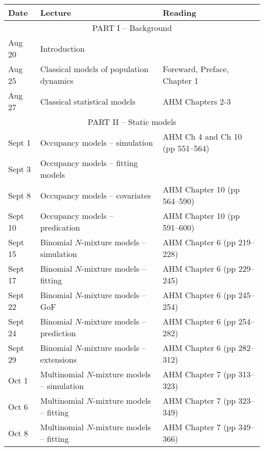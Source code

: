 \documentclass[12pt]{article}
\begin{document}
\begin{center}
\begin{tabular}[c]{lll}
\hline \hline
{\bf Date} & {\bf Lecture}                                & {\bf Reading}                    \\
\hline
           \multicolumn{3}{c}{PART I -- Background}                                          \\
\hline
Aug 20     & Introduction                                 &                                  \\
\hline
Aug 25     & Classical models of population dynamics      & Foreward, Preface, Chapter 1     \\
Aug 27     & Classical statistical models                 & AHM Chapters 2-3                 \\
\hline
           \multicolumn{3}{c}{PART II -- Static models}                                      \\
\hline
Sept 1     & Occupancy models -- simulation               & AHM Ch 4 and Ch 10 (pp 551--564) \\
Sept 3     & Occupancy models -- fitting models           &                                  \\
\hline
Sept 8     & Occupancy models -- covariates               & AHM Chapter 10 (pp 564--590)     \\
Sept 10    & Occupancy models -- predication              & AHM Chapter 10 (pp 591--600)     \\
\hline
Sept 15    & Binomial $N$-mixture models -- simulation    & AHM Chapter 6 (pp 219--228)      \\
Sept 17    & Binomial $N$-mixture models -- fitting       & AHM Chapter 6 (pp 229--245)      \\
\hline
Sept 22    & Binomial $N$-mixture models -- GoF           & AHM Chapter 6 (pp 245--254)      \\
Sept 24    & Binomial $N$-mixture models -- prediction    & AHM Chapter 6 (pp 254--282)      \\
\hline
Sept 29    & Binomial $N$-mixture models -- extensions    & AHM Chapter 6 (pp 282--312)      \\
Oct 1      & Multinomial $N$-mixture models -- simulation & AHM Chapter 7 (pp 313--323)      \\
\hline
Oct 6      & Multinomial $N$-mixture models -- fitting    & AHM Chapter 7 (pp 323--349)      \\
Oct 8      & Multinomial $N$-mixture models -- fitting    & AHM Chapter 7 (pp 349--366)      \\

\end{tabular}
\end{center}
\end{document}

